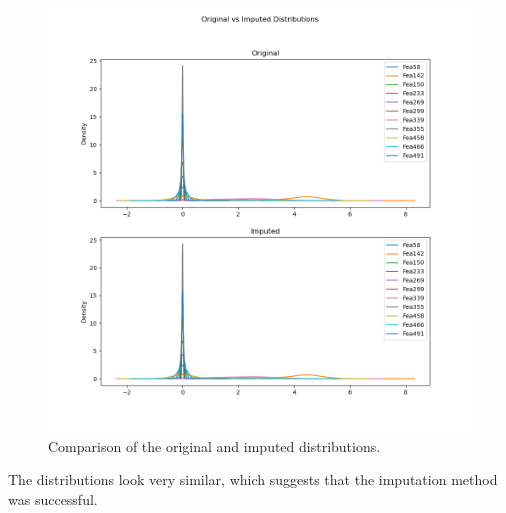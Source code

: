 \documentclass{article}
\begin{document}
\begin{enumerate}[label=\alph*)]
\begin{figure}[!htb]
        \includegraphics[width=\textwidth]{Q3c_original_vs_imputed_dists.png}
        \caption{Comparison of the original and imputed distributions.}
        \label{fig:Q3c_Imputed_Distribution}
    \end{figure}
    The distributions look very similar, which suggests that the imputation method was successful. %


\end{enumerate}
\end{document}
